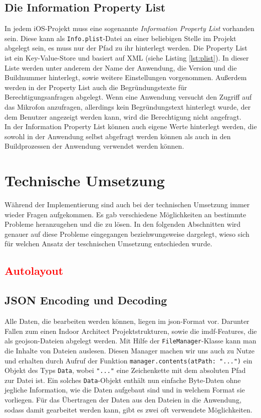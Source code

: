 \subsection{Die Information Property List}
In jedem iOS-Projekt muss eine sogenannte \textit{Information Property List} vorhanden sein.
Diese kann als \texttt{Info.plist}-Datei an einer beliebigen Stelle im Projekt abgelegt sein, es muss nur der Pfad zu ihr hinterlegt werden.
Die Property List ist ein Key-Value-Store und basiert auf XML (siehe Listing \ref{lst:plist}).
In dieser Liste werden unter anderem der Name der Anwendung, die Version und die Buildnummer hinterlegt, sowie weitere Einstellungen vorgenommen.
Außerdem werden in der Property List auch die Begründungstexte für Berechtigungsanfragen abgelegt.
Wenn eine Anwendung versucht den Zugriff auf das Mikrofon anzufragen, allerdings kein Begründungstext hinterlegt wurde, der dem Benutzer angezeigt werden kann, wird die Berechtigung nicht angefragt.
\\
In der Information Property List können auch eigene Werte hinterlegt werden, die sowohl in der Anwendung selbst abgefragt werden können als auch in den Buildprozessen der Anwendung verwendet werden können.

\section{Technische Umsetzung}
\label{sec:techimp}
Während der Implementierung sind auch bei der technischen Umsetzung immer wieder Fragen aufgekommen.
Es gab verschiedene Möglichkeiten an bestimmte Probleme heranzugehen und die zu lösen.
In den folgenden Abschnitten wird genauer auf diese Probleme eingegangen beziehwungsweise dargelegt, wieso sich für welchen Ansatz der teschnischen Umsetzung entschieden wurde.
\subsection{\textcolor{red}{Autolayout}}
\label{subsec:autolayout}
\subsection{JSON Encoding und Decoding}
\label{subsec:encodingdecoding}
Alle Daten, die bearbeiten werden können, liegen im \ac{json}-Format vor.
Darunter Fallen zum einen Indoor Architect Projektstrukturen, sowie die \ac{imdf}-Features, die als \ac{geojson}-Dateien abgelegt werden.
Mit Hilfe der \texttt{FileManager}-Klasse kann man die Inhalte von Dateien auslesen.
Diesen Manager machen wir uns auch zu Nutze und erhalten durch Aufruf der Funktion \texttt{manager.contents(atPath: "...")} ein Objekt des Typs \texttt{Data}, wobei \texttt{"..."} eine Zeichenkette mit dem absoluten Pfad zur Datei ist.
Ein solches \texttt{Data}-Objekt enthält nun einfache Byte-Daten ohne jegliche Information, wie die Daten aufgebaut sind und in welchem Format sie vorliegen.
Für das Übertragen der Daten aus den Dateien in die Anwendung, sodass damit gearbeitet werden kann, gibt es zwei oft verwendete Möglichkeiten.
